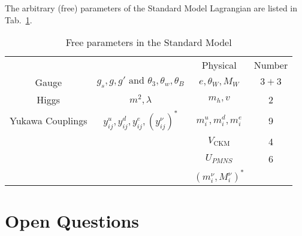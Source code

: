 The arbitrary (free) parameters of the Standard Model Lagrangian are listed in Tab.~\ref{tab:parameters}.
\begin{table}[tbhp]
  \centering
  \begin{tabular}{c c c c}
   &  & Physical & Number \\
  Gauge & $g_s, g, g' \text{ and } \theta_3, \theta_w, \theta_B $ & $e, \theta_W, M_W$ & $3 + 3$ \\
  Higgs & $m^2, \lambda$ & $m_h, v$ & 2 \\
  Yukawa Couplings & $y^{u}_{ij}, y^{d}_{ij}, y^{e}_{ij}, (y^{\nu}_{ij})^*$ & $m^{u}_{i}, m^{d}_{i}, m^{e}_{i} $ & 9 \\
   &  & $V_{\text{CKM}}$ & 4 \\
    &  & $U_{PMNS}$ & 6 \\
    &  &  $(m^{\nu}_{i}, M^{\nu}_{i})^*$ & \\
  \end{tabular}
  \caption{Free parameters in the Standard Model}
  \label{tab:parameters}
\end{table}

\section{Open Questions}%
\label{sec:open_questions}

